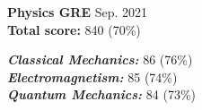 \documentclass[9pt, purple]{./template/cv} %
\begin{document}
\hfill
\begin{minipage}[t]{0.32\textwidth}
	\vspace{-\baselineskip} %
	
	
	\vspace{1.2mm}
	
	\textbf{Physics GRE} \hfill \footnotesize \textcolor{accentbackground}{Sep. 2021}\\

        \vspace{-1mm}
        \textcolor{accentbackground}{\small\textbf{Total score: }} 840 (70\%)\\ 
        \begin{minipage}[t]{\linewidth}
            \vspace{-\baselineskip}
            \vspace{1em}
            \textcolor{accentbackground}{\itemmarker \textbf{\textit{Classical Mechanics: }}} 86 (76\%)\\
            
            \vspace{-2mm}
            \textcolor{accentbackground}{\itemmarker \textbf{\textit{Electromagnetism: }}} 85 (74\%)\\

            \vspace{-2mm}
            \textcolor{accentbackground}{\itemmarker \textbf{\textit{Quantum Mechanics: }}} 84 (73\%)\\
        \end{minipage}
\end{minipage}


\clearpage

\end{document}
